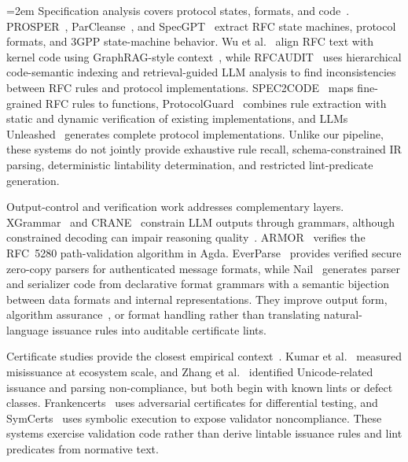 \begingroup\emergencystretch=2em\relax
Specification analysis covers protocol states, formats, and code~\cite{pacheco2022automated,yen2021sage}.
PROSPER~\cite{sharma2023prosper}, ParCleanse~\cite{zheng2025validating}, and
SpecGPT~\cite{zhang2025automated} extract RFC state machines, protocol formats,
and 3GPP state-machine behavior. Wu et al.~\cite{wu2025uncovering} align RFC text
with kernel code using GraphRAG-style context~\cite{lewis2020retrieval,edge2024local,peng2025graph},
while RFCAUDIT~\cite{zheng2025rfcaudit} uses hierarchical code-semantic indexing
and retrieval-guided LLM analysis to find inconsistencies between RFC rules and
protocol implementations. SPEC2CODE~\cite{wang2025spec2code} maps fine-grained
RFC rules to functions, ProtocolGuard~\cite{song2026protocolguard} combines rule
extraction with static and dynamic verification of existing implementations, and
LLMs Unleashed~\cite{long2026llms} generates complete protocol implementations.
Unlike our pipeline, these systems do not jointly provide exhaustive rule recall,
schema-constrained IR parsing, deterministic lintability determination, and
restricted lint-predicate generation.
\par\endgroup


Output-control and verification work addresses complementary layers.
XGrammar~\cite{dong2025xgrammar} and CRANE~\cite{banerjee2025crane} constrain LLM
outputs through grammars, although constrained decoding can impair reasoning
quality~\cite{schall2025hidden,park2024grammar}. ARMOR~\cite{debnath2024armor} verifies the
RFC~5280 path-validation algorithm in Agda. EverParse~\cite{ramananandro2019everparse}
provides verified secure zero-copy parsers for authenticated message formats, while
Nail~\cite{bangert2014nail} generates parser and serializer code from declarative
format grammars with a semantic bijection between data formats and internal representations.
They improve output form, algorithm assurance~\cite{debnath2021reengineering}, or
format handling rather than translating natural-language issuance rules into
auditable certificate lints.

Certificate studies provide the closest empirical context~\cite{durumeric2013analysis,georgiev2012most,amann2017mission,ma2021tracing,zhang2021rusted}. Kumar et
al.~\cite{kumar2018tracking} measured misissuance at ecosystem scale, and Zhang et
al.~\cite{zhang2025unicert} identified Unicode-related issuance and parsing
non-compliance, but both begin with known lints or defect classes.
Frankencerts~\cite{brubaker2014frankencerts} uses adversarial certificates for
differential testing, and SymCerts~\cite{chau2017symcerts} uses symbolic execution
to expose validator noncompliance. These systems exercise validation code rather
than derive lintable issuance rules and lint predicates from normative text.
